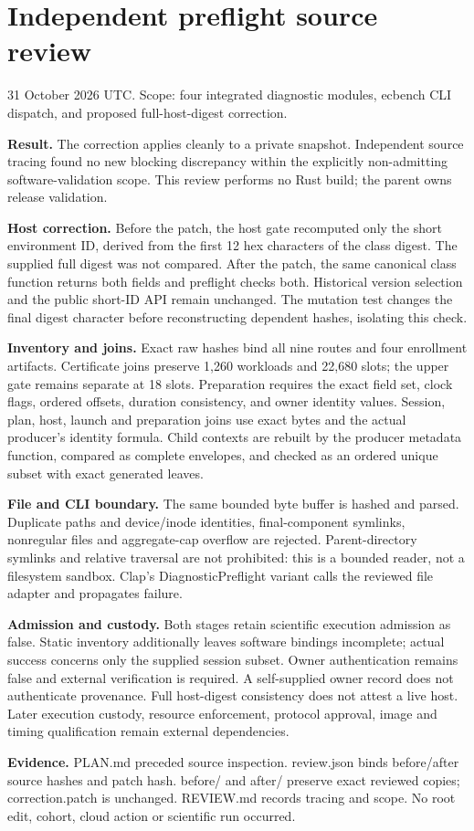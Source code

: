\documentclass[11pt]{article}
\begin{document}
\section*{Independent preflight source review}
31 October 2026 UTC. Scope: four integrated diagnostic modules, ecbench CLI dispatch, and proposed full-host-digest correction.

\textbf{Result.} The correction applies cleanly to a private snapshot. Independent source tracing found no new blocking discrepancy within the explicitly non-admitting software-validation scope. This review performs no Rust build; the parent owns release validation.

\textbf{Host correction.} Before the patch, the host gate recomputed only the short environment ID, derived from the first 12 hex characters of the class digest. The supplied full digest was not compared. After the patch, the same canonical class function returns both fields and preflight checks both. Historical version selection and the public short-ID API remain unchanged. The mutation test changes the final digest character before reconstructing dependent hashes, isolating this check.

\textbf{Inventory and joins.} Exact raw hashes bind all nine routes and four enrollment artifacts. Certificate joins preserve 1,260 workloads and 22,680 slots; the upper gate remains separate at 18 slots. Preparation requires the exact field set, clock flags, ordered offsets, duration consistency, and owner identity values. Session, plan, host, launch and preparation joins use exact bytes and the actual producer's identity formula. Child contexts are rebuilt by the producer metadata function, compared as complete envelopes, and checked as an ordered unique subset with exact generated leaves.

\textbf{File and CLI boundary.} The same bounded byte buffer is hashed and parsed. Duplicate paths and device/inode identities, final-component symlinks, nonregular files and aggregate-cap overflow are rejected. Parent-directory symlinks and relative traversal are not prohibited: this is a bounded reader, not a filesystem sandbox. Clap's DiagnosticPreflight variant calls the reviewed file adapter and propagates failure.

\textbf{Admission and custody.} Both stages retain scientific execution admission as false. Static inventory additionally leaves software bindings incomplete; actual success concerns only the supplied session subset. Owner authentication remains false and external verification is required. A self-supplied owner record does not authenticate provenance. Full host-digest consistency does not attest a live host. Later execution custody, resource enforcement, protocol approval, image and timing qualification remain external dependencies.

\textbf{Evidence.} PLAN.md preceded source inspection. review.json binds before/after source hashes and patch hash. before/ and after/ preserve exact reviewed copies; correction.patch is unchanged. REVIEW.md records tracing and scope. No root edit, cohort, cloud action or scientific run occurred.
\end{document}
